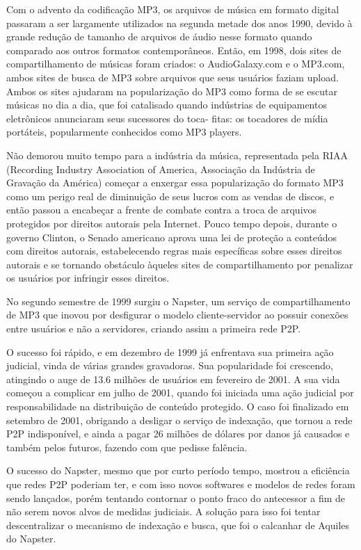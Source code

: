 Com o advento da codificação MP3, os arquivos de música em formato digital passaram a ser
largamente utilizados na segunda metade dos anos 1990, devido à grande redução de tamanho
de arquivos de áudio nesse formato quando comparado aos outros formatos contemporâneos.
Então, em 1998, dois sites de compartilhamento de músicas foram criados: o
AudioGalaxy.com e o MP3.com, ambos sites de busca de MP3 sobre arquivos que seus usuários
faziam upload. Ambos os sites ajudaram na popularização do MP3 como forma de se escutar
músicas no dia a dia, que foi catalisado quando indústrias de equipamentos eletrônicos
anunciaram seus sucessores do toca- fitas: os tocadores de mídia portáteis, popularmente
conhecidos como MP3 players.

Não demorou muito tempo para a indústria da música, representada pela RIAA (Recording
Industry Association of America, Associação da Indústria de Gravação da América) começar
a enxergar essa popularização do formato MP3 como um perigo real de diminuição de seus
lucros com as vendas de discos, e então passou a encabeçar a frente de combate contra a
troca de arquivos protegidos por direitos autorais pela Internet. Pouco tempo depois,
durante o governo Clinton, o Senado americano aprova uma lei de proteção a conteúdos com
direitos autorais, estabelecendo regras mais específicas sobre esses direitos autorais e
se tornando obstáculo àqueles sites de compartilhamento por penalizar os usuários por
infringir esses direitos.

No segundo semestre de 1999 surgiu o Napster, um serviço de compartilhamento de MP3 que
inovou por desfigurar o modelo cliente-servidor ao possuir conexões entre usuários e não
a servidores, criando assim a primeira rede P2P.

O sucesso foi rápido, e em dezembro de 1999 já enfrentava sua primeira ação judicial,
vinda de várias grandes gravadoras. Sua popularidade foi crescendo, atingindo o auge de
13.6 milhões de usuários em fevereiro de 2001. A sua vida começou a complicar em julho de
2001, quando foi iniciada uma ação judicial por responsabilidade na distribuição de
conteúdo protegido. O caso foi finalizado em setembro de 2001, obrigando a desligar o
serviço de indexação, que tornou a rede P2P indisponível, e ainda a pagar 26 milhões de
dólares por danos já causados e também pelos futuros, fazendo com que pedisse falência.

O sucesso do Napster, mesmo que por curto período tempo, mostrou a eficiência que redes
P2P poderiam ter, e com isso novos softwares e modelos de redes foram sendo lançados,
porém tentando contornar o ponto fraco do antecessor a fim de não serem novos alvos de
medidas judiciais. A solução para isso foi tentar descentralizar o mecanismo de indexação
e busca, que foi o calcanhar de Aquiles do Napster.


